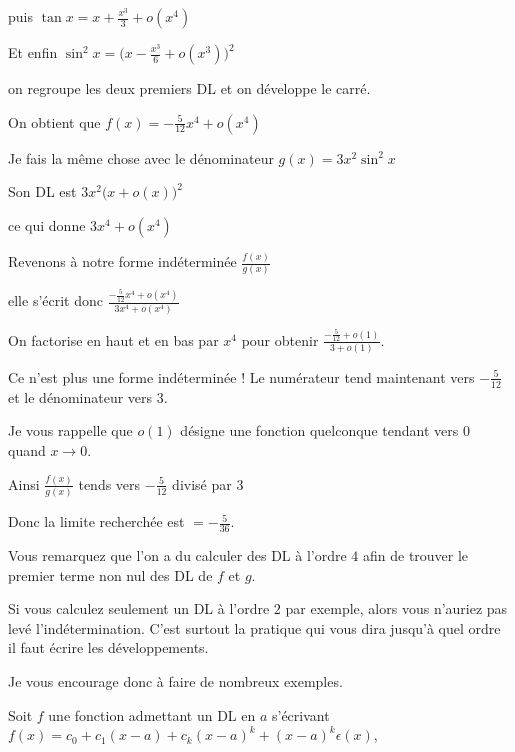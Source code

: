 \change

puis $\tan x=x+\frac{x^3}{3}+o(x^4)$

\change

Et enfin $\sin^2x = \big(x-\frac{x^3}{6}+o(x^3)\big)^2$

\change

on regroupe les deux premiers DL et on développe le carré.

\change

On obtient que 
$f(x)= -\frac{5}{12}x^4 + o(x^4)$

\change

Je fais la même chose avec le dénominateur 
$g(x)=3x^2\sin^2x$

\change

Son DL est $3x^2\big(x+o(x)\big)^2$

\change 

ce qui donne $3x^4+o(x^4)$

\change

Revenons à notre forme indéterminée $\frac{f(x)}{g(x)}$

elle s'écrit donc $\frac{-\frac{5}{12}x^4 + o(x^4)}{3x^4+o(x^4)}$

\change

On factorise en haut et en bas par $x^4$ pour obtenir
$\frac{-\frac{5}{12} + o(1)}{3+o(1)}$.

Ce n'est plus une forme indéterminée ! Le numérateur 
tend maintenant vers $-\frac{5}{12}$
et le dénominateur vers $3$.

Je vous rappelle que $o(1)$ désigne une fonction quelconque tendant vers $0$ quand $x \to 0$.

\change

Ainsi $\frac{f(x)}{g(x)}$ tends vers $-\frac{5}{12}$ divisé par $3$

Donc la limite recherchée est $=-\frac{5}{36}$.


Vous remarquez que l'on a du calculer des DL à l'ordre $4$ afin de trouver 
le premier terme non nul des DL de $f$ et $g$.

Si vous calculez seulement un DL à l'ordre $2$ par exemple, alors vous n'auriez pas levé l'indétermination.
C'est surtout la pratique qui vous dira jusqu'à quel ordre il faut écrire les développements.

Je vous encourage donc à faire de nombreux exemples.


\diapo


Soit $f$ une fonction admettant un DL en $a$ 
s'écrivant 
$f(x)=c_0+c_1(x-a)+c_k(x-a)^k+(x-a)^k\epsilon(x)$, 

